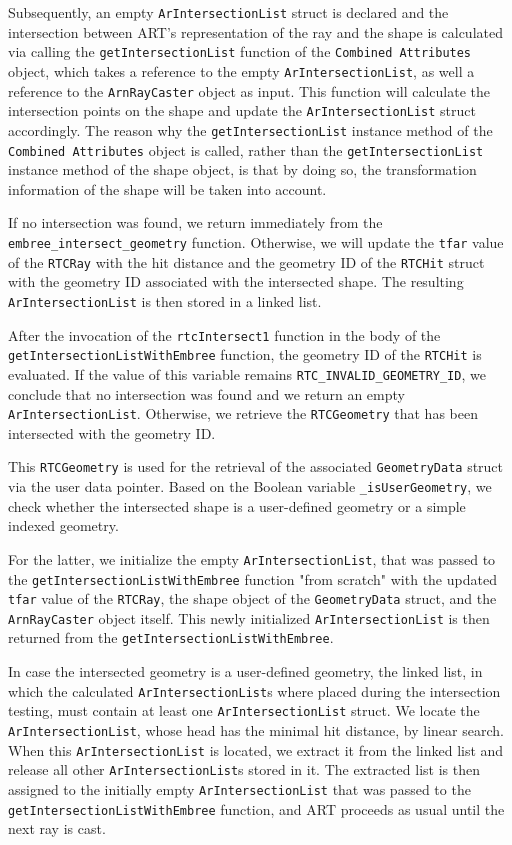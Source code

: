 Subsequently, an empty \texttt{ArIntersectionList} struct is declared and the intersection between ART's representation of the ray and the shape is calculated via calling the \texttt{getIntersectionList} function of the \texttt{Combined Attributes} object, which takes a reference to the empty \texttt{ArIntersectionList}, as well a reference to the \texttt{ArnRayCaster} object as input.
This function will calculate the intersection points on the shape and update the \texttt{ArIntersectionList} struct accordingly. The reason why the \texttt{getIntersectionList} instance method of the \texttt{Combined Attributes} object is called, rather than the \texttt{getIntersectionList} instance method of the shape object, is that by doing so, the transformation information of the shape will be taken into account.

If no intersection was found, we return immediately from the \texttt{embree\_intersect\_geometry} function. Otherwise, we will update the \texttt{tfar} value of the \texttt{RTCRay} with the hit distance and the geometry ID of the \texttt{RTCHit} struct with the geometry ID associated with the intersected shape.
The resulting \texttt{ArIntersectionList} is then stored in a linked list.

After the invocation of the \texttt{rtcIntersect1} function in the body of the  \texttt{getIntersectionListWithEmbree} function, the geometry ID of the \texttt{RTCHit} is evaluated. If the value of this variable remains \texttt{RTC\_INVALID\_GEOMETRY\_ID}, we conclude that no intersection was found and we return an empty \texttt{ArIntersectionList}. Otherwise, we retrieve the \texttt{RTCGeometry} that has been intersected with the geometry ID.

This \texttt{RTCGeometry} is used for the retrieval of the associated \texttt{GeometryData} struct via the user data pointer. Based on the Boolean variable \texttt{\_isUserGeometry}, we check whether the intersected shape is a user-defined geometry or a simple indexed geometry.

For the latter, we initialize the empty \texttt{ArIntersectionList}, that was passed to the \texttt{getIntersectionListWithEmbree} function "from scratch" with the updated \texttt{tfar} value of the \texttt{RTCRay}, the shape object of the \texttt{GeometryData} struct, and the \texttt{ArnRayCaster} object itself. This newly initialized \texttt{ArIntersectionList} is then returned from the \texttt{getIntersectionListWithEmbree}.

In case the intersected geometry is a user-defined geometry, the linked list, in which the calculated \texttt{ArIntersectionList}s where placed during the intersection testing, must contain at least one \texttt{ArIntersectionList} struct. We locate the \texttt{ArIntersectionList}, whose head has the minimal hit distance, by linear search. When this \texttt{ArIntersectionList} is located, we extract it from the linked list and release all other \texttt{ArIntersectionList}s stored in it. The extracted list is then assigned to the initially empty \texttt{ArIntersectionList} that was passed to the \texttt{getIntersectionListWithEmbree} function, and ART proceeds as usual until the next ray is cast.


